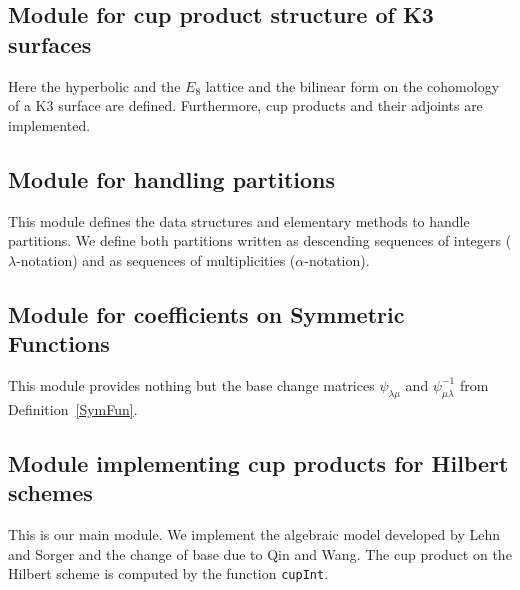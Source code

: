 \subsection{Module for cup product structure of K3 surfaces} 
Here the hyperbolic and the $E_8$ lattice and the bilinear form on the cohomology of a K3 surface are defined. Furthermore, cup products and their adjoints are implemented.

\subsection{Module for handling partitions} 
This module defines the data structures and elementary methods to handle partitions. We define both partitions written as descending sequences of integers ($\lambda$-notation) and as sequences of multiplicities ($\alpha$-notation).

\subsection{Module for coefficients on Symmetric Functions} 
This module provides nothing but the base change matrices $\psi_{\lambda\mu}$ and $\psi^{-1}_{\mu\lambda}$ from Definition~\ref{SymFun}.
 
\subsection{Module implementing cup products for Hilbert schemes} This is our main module. We implement the algebraic model developed by Lehn and Sorger and the change of base due to Qin and Wang. The cup product on the Hilbert scheme is computed by the function \texttt{cupInt}.

 
